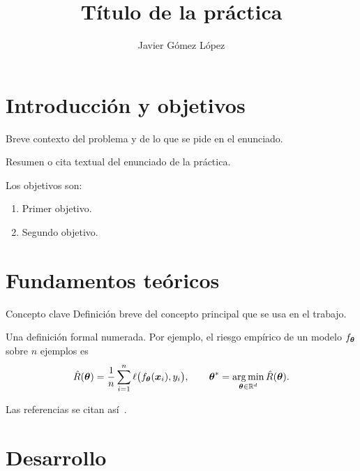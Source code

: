 \documentclass{upo-master}
\title{Título de la práctica}
\author{Javier Gómez López}
\begin{document}
\maketitle

\section{Introducción y objetivos}

Breve contexto del problema y de lo que se pide en el enunciado.

\begin{enunciado}
Resumen o cita textual del enunciado de la práctica.
\end{enunciado}

Los objetivos son:
\begin{enumerate}
  \item Primer objetivo.
  \item Segundo objetivo.
\end{enumerate}

\section{Fundamentos teóricos}

\begin{concepto}{Concepto clave}
Definición breve del concepto principal que se usa en el trabajo.
\end{concepto}

\begin{definicion}
Una definición formal numerada. Por ejemplo, el riesgo empírico de un
modelo $f_{\boldsymbol{\theta}}$ sobre $n$ ejemplos es
\begin{equation}
  \hat{R}(\boldsymbol{\theta}) = \frac{1}{n}\sum_{i=1}^{n} \ell\bigl(f_{\boldsymbol{\theta}}(\boldsymbol{x}_i), y_i\bigr),
  \qquad
  \boldsymbol{\theta}^{*} = \operatorname*{arg\,min}_{\boldsymbol{\theta}\in\mathbb{R}^d} \hat{R}(\boldsymbol{\theta}).
\end{equation}
\end{definicion}

Las referencias se citan así~\cite{russell-norvig}.

\section{Desarrollo}
\end{document}
